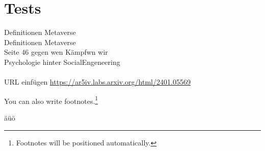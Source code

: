 

%


\section*{Tests}

Definitionen Metaverse \cite{Ball22}
\\Definitionen Metaverse \cite{Drip22} \\
Seite 46 gegen wen Kämpfwn wir \cite{Hypp22}\\
Psychologie hinter SocialEngeneering \cite{schu11}\\
\\

URL einfügen \url{https://ar5iv.labs.arxiv.org/html/2401.05569}


You can also write footnotes.\footnote{Footnotes will be positioned automatically.}

äüö

